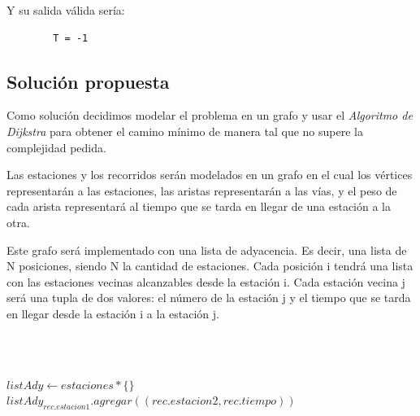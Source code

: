        Y su salida válida sería:

        \begin{verbatim}
        T = -1
        \end{verbatim}


    \subsection{Solución propuesta}
    
    \par Como solución decidimos modelar el problema en un grafo y usar el \emph{Algoritmo de Dijkstra} para obtener el camino mínimo de manera tal que no supere la complejidad pedida.

    \par Las estaciones y los recorridos serán modelados en un grafo en el cual los vértices representarán a las estaciones, las aristas representarán a las vías, y el peso de cada arista representará al tiempo que se tarda en llegar de una estación a la otra.
    \par Este grafo será implementado con una lista de adyacencia. Es decir, una lista de N posiciones, siendo N la cantidad de estaciones. Cada posición i tendrá una lista con las estaciones vecinas alcanzables desde la estación i. Cada estación vecina j será una tupla de dos valores: el número de la estación j y el tiempo que se tarda en llegar desde la estación i a la estación j.
    
     \\~\\
     
    \begin{algorithmic}
    \State {}
        \State $listAdy \gets estaciones * \{\}$ 
         
            \State $listAdy_{rec.estacion1}.agregar((rec.estacion2, rec.tiempo))$ 
        \EndFor
        \State {}
    \EndFunction
    \end{algorithmic}
     
     \\~\\
    
